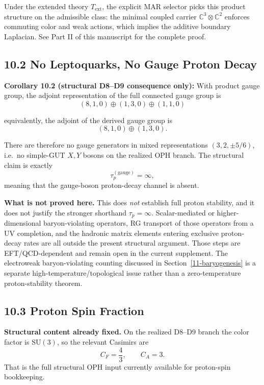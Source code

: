 Under the extended theory \(T_{\mathrm{ext}}\), the explicit MAR selector picks this product structure on the admissible class: the minimal coupled carrier \(\mathbb{C}^3 \otimes \mathbb{C}^2\) enforces commuting color and weak actions, which implies the additive boundary Laplacian. See Part II of this manuscript for the complete proof.

\subsection{10.2 No Leptoquarks, No Gauge Proton Decay}\label{102-no-leptoquarks-no-gauge-proton-decay}

\textbf{Corollary 10.2 (structural D8--D9 consequence only):} With product gauge group, the adjoint representation of the full connected gauge group is \[(8,1,0) \oplus (1,3,0) \oplus (1,1,0)\]

equivalently, the adjoint of the derived gauge group is
\[
(8,1,0) \oplus (1,3,0).
\]

There are therefore no gauge generators in mixed representations \((3,2,\pm 5/6)\), i.e.\ no simple-GUT \(X,Y\) bosons on the realized OPH branch. The structural claim is exactly
\[
\tau_p^{(\text{gauge})} = \infty,
\]
meaning that the gauge-boson proton-decay channel is absent.

\textbf{What is not proved here.} This does \emph{not} establish full proton stability, and it does not justify the stronger shorthand \(\tau_p=\infty\). Scalar-mediated or higher-dimensional baryon-violating operators, RG transport of those operators from a UV completion, and the hadronic matrix elements entering exclusive proton-decay rates are all outside the present structural argument. Those steps are EFT/QCD-dependent and remain open in the current supplement. The electroweak baryon-violating counting discussed in Section~\ref{11-baryogenesis} is a separate high-temperature/topological issue rather than a zero-temperature proton-stability theorem.

\subsection{10.3 Proton Spin Fraction}\label{103-proton-spin-fraction}

\textbf{Structural content already fixed.} On the realized D8--D9 branch the color factor is \(\mathrm{SU}(3)\), so the relevant Casimirs are
\[
C_F=\frac43,\qquad C_A=3.
\]
That is the full structural OPH input currently available for proton-spin bookkeeping.

